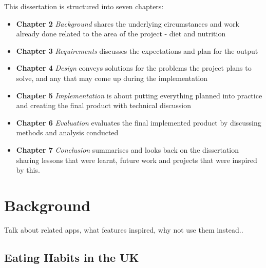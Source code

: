 \documentclass{l4proj}
\begin{document}
This dissertation is structured into seven chapters:

\begin{itemize}
    \item \textbf{Chapter 2} \textit{Background} shares the underlying circumstances and work already done related to the area of the project - diet and nutrition
    \item \textbf{Chapter 3} \textit{Requirements} discusses the expectations and plan for the output
    \item \textbf{Chapter 4} \textit{Design} conveys solutions for the problems the project plans to solve, and any that may come up during the implementation
    \item \textbf{Chapter 5} \textit{Implementation} is about putting everything planned into practice and creating the final product with technical discussion
    \item \textbf{Chapter 6} \textit{Evaluation} evaluates the final implemented product by discussing methods and analysis conducted
    \item \textbf{Chapter 7} \textit{Conclusion} summarises and looks back on the dissertation sharing lessons that were learnt, future work and projects that were inspired by this.
\end{itemize}









\chapter{Background}

Talk about related apps, what features inspired, why not use them instead..

\section{Eating Habits in the UK}
\end{document}

